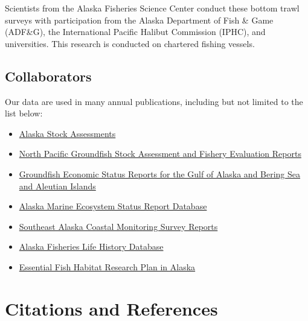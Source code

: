 \documentclass[
  letterpaper,
  oneside,
  open=any]{scrbook}
\providecommand{\tightlist}{%
  \setlength{\itemsep}{0pt}\setlength{\parskip}{0pt}}\usepackage{longtable,booktabs,array}
\begin{document}
Scientists from the Alaska Fisheries Science Center conduct these bottom
trawl surveys with participation from the Alaska Department of Fish \&
Game (ADF\&G), the International Pacific Halibut Commission (IPHC), and
universities. This research is conducted on chartered fishing vessels.

\section{Collaborators}\label{collaborators}

Our data are used in many annual publications, including but not limited
to the list below:

\begin{itemize}
\tightlist
\item
  \href{https://www.fisheries.noaa.gov/alaska/population-assessments/alaska-stock-assessments}{Alaska
  Stock Assessments}
\item
  \href{https://www.fisheries.noaa.gov/alaska/population-assessments/north-pacific-groundfish-stock-assessment-and-fishery-evaluation}{North
  Pacific Groundfish Stock Assessment and Fishery Evaluation Reports}
\item
  \href{https://www.fisheries.noaa.gov/alaska/commercial-fishing/groundfish-economic-status-reports-gulf-alaska-and-bering-sea-and-aleutian-islands}{Groundfish
  Economic Status Reports for the Gulf of Alaska and Bering Sea and
  Aleutian Islands}
\item
  \href{https://www.fisheries.noaa.gov/resource/data/alaska-marine-ecosystem-status-report-archive}{Alaska
  Marine Ecosystem Status Report Database}
\item
  \href{https://www.fisheries.noaa.gov/alaska/commercial-fishing/southeast-alaska-coastal-monitoring-survey-reports}{Southeast
  Alaska Coastal Monitoring Survey Reports}
\item
  \href{https://www.fisheries.noaa.gov/resource/data/alaska-fisheries-life-history-database}{Alaska
  Fisheries Life History Database}
\item
  \href{https://www.fisheries.noaa.gov/alaska/habitat-conservation/essential-fish-habitat-research-plan-alaska}{Essential
  Fish Habitat Research Plan in Alaska}
\end{itemize}

\chapter{Citations and References}\label{citations-and-references}
\end{document}

